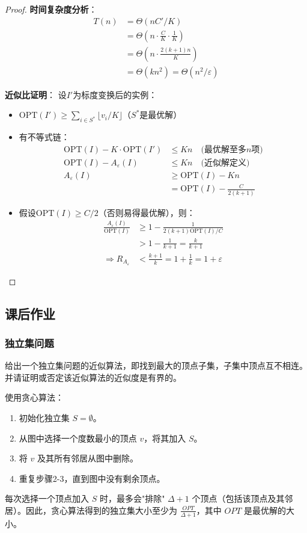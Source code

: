 \documentclass[./../main.tex]{subfiles} %
\begin{document}
\begin{proof}
\textbf{时间复杂度分析}：
\begin{align*}
T(n) &= \Theta(nC'/K) \\
&= \Theta\left(n \cdot \frac{C}{K} \cdot \frac{1}{K}\right) \\
&= \Theta\left(n \cdot \frac{2(k+1)n}{K}\right) \\
&= \Theta(kn^2) = \Theta(n^2/\varepsilon)
\end{align*}

\textbf{近似比证明}：
设$I'$为标度变换后的实例：
\begin{itemize}
    \item $\text{OPT}(I') \geq \sum_{i \in S^*} \lfloor v_i/K \rfloor$（$S^*$是最优解）
    \item 有不等式链：
    \begin{align*}
    \text{OPT}(I) - K \cdot \text{OPT}(I') &\leq Kn \quad \text{(最优解至多$n$项)} \\
    \text{OPT}(I) - A_{\varepsilon}(I) &\leq Kn \quad \text{(近似解定义)} \\
    A_{\varepsilon}(I) &\geq \text{OPT}(I) - Kn \\
    &= \text{OPT}(I) - \frac{C}{2(k+1)} 
    \end{align*}
    
    \item 假设$\text{OPT}(I) \geq C/2$（否则易得最优解），则：
    \begin{align*}
    \frac{A_{\varepsilon}(I)}{\text{OPT}(I)} &\geq 1 - \frac{1}{2(k+1)\text{OPT}(I)/C} \\
    &> 1 - \frac{1}{k+1} = \frac{k}{k+1} \\
    \Rightarrow R_{A_\varepsilon} &< \frac{k+1}{k} = 1 + \frac{1}{k} = 1 + \varepsilon
    \end{align*}
\end{itemize}
\end{proof}

\subsection{课后作业}
\subsubsection{独立集问题}
给出一个独立集问题的近似算法，即找到最大的顶点子集，子集中顶点互不相连。并请证明或否定该近似算法的近似度是有界的。

使用贪心算法：
\begin{enumerate}
    \item 初始化独立集 $S = \emptyset$。
    \item 从图中选择一个度数最小的顶点 $v$，将其加入 $S$。
    \item 将 $v$ 及其所有邻居从图中删除。
    \item 重复步骤2-3，直到图中没有剩余顶点。
\end{enumerate}
每次选择一个顶点加入 $S$ 时，最多会"排除" $\Delta + 1$ 个顶点（包括该顶点及其邻居）。因此，贪心算法得到的独立集大小至少为 $\frac{OPT}{\Delta + 1}$，其中 $OPT$ 是最优解的大小。
\end{document}
